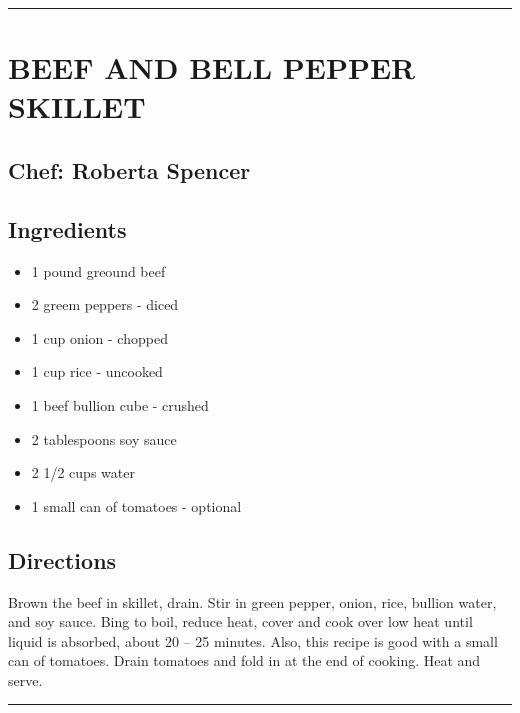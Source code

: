 \documentclass[
]{book}
\providecommand{\tightlist}{%
  \setlength{\itemsep}{0pt}\setlength{\parskip}{0pt}}
\begin{document}
\begin{center}\rule{0.5\linewidth}{0.5pt}\end{center}

\hypertarget{beef-and-bell-pepper-skillet}{%
\section*{BEEF AND BELL PEPPER SKILLET}\label{beef-and-bell-pepper-skillet}}


\hypertarget{chef-roberta-spencer-15}{%
\subsection*{Chef: Roberta Spencer}\label{chef-roberta-spencer-15}}


\hypertarget{ingredients-43}{%
\subsection*{Ingredients}\label{ingredients-43}}


\begin{itemize}
\tightlist
\item
  1 pound greound beef
\item
  2 greem peppers - diced
\item
  1 cup onion - chopped
\item
  1 cup rice - uncooked
\item
  1 beef bullion cube - crushed
\item
  2 tablespoons soy sauce
\item
  2 1/2 cups water
\item
  1 small can of tomatoes - optional
\end{itemize}

\hypertarget{directions-43}{%
\subsection*{Directions}\label{directions-43}}


Brown the beef in skillet, drain. Stir in green pepper, onion, rice, bullion water,
and soy sauce. Bing to boil, reduce heat, cover and cook over low heat until
liquid is absorbed, about 20 -- 25 minutes. Also, this recipe is good with a small can of
tomatoes. Drain tomatoes and fold in at the end of cooking. Heat and serve.

\begin{center}\rule{0.5\linewidth}{0.5pt}\end{center}
\end{document}
